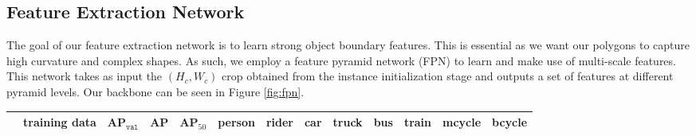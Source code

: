 \documentclass[10pt,twocolumn,letterpaper]{article}
\begin{document}
\subsection{Feature Extraction Network}
\label{sec:fpn}
The goal of our feature extraction network is to learn strong object boundary features. This is essential as we want our polygons to capture high curvature and complex shapes. As such, we employ a feature pyramid network (FPN) \cite{fpn} to learn and make use of multi-scale features. This network takes as input the $(H_c, W_c)$ crop obtained from the instance initialization stage and outputs a set of features at different pyramid levels. Our backbone can be seen in Figure \ref{fig:fpn}.



\setlength{\tabcolsep}{2pt}

\begin{table*}[t!]
\vspace{-0.5cm}
\setlength{\tabcolsep}{2pt}
\centering
  \begin{tabular}{|c|c|c|cc|cccccccc|}
  \cline{2-13}
  \multicolumn{1}{c|}{} & \multicolumn{1}{c|}{training data} &  \multicolumn{1}{c|}{AP$_ {\texttt{val}}$} & \multicolumn{1}{c}{AP} & AP$_{50}$ & \multicolumn{1}{c}{person}& \multicolumn{1}{c}{rider} & \multicolumn{1}{c}{car} & \multicolumn{1}{c}{truck} & \multicolumn{1}{c}{bus} & \multicolumn{1}{c}{train} & \multicolumn{1}{c}{mcycle} & bcycle \\ 
  \hline 



\end{tabular}
\end{table*}
\end{document}

